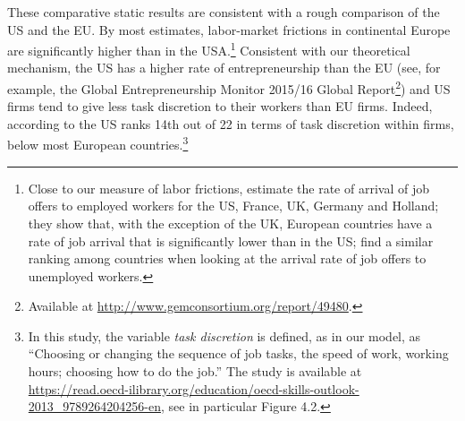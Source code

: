 \documentclass[12pt,american]{paper}
\theoremstyle{remark}
\begin{document}
These comparative static results are consistent with a rough comparison of the US and the EU.  By most estimates, labor-market frictions in continental Europe are significantly higher than in the USA.\footnote{%
Close to our measure of labor frictions, \citet{ridder2003measuring} estimate the rate of arrival of job offers to employed workers for the US, France, UK, Germany and Holland; they show that, with the exception of the UK, European countries have a rate of job arrival that is significantly lower than in the US; \citet*{layard2005unemployment} find a similar ranking among countries when looking at the arrival rate of job offers to unemployed workers.
 }  Consistent with our theoretical mechanism, the US has a higher rate of entrepreneurship than the EU (see, for example, the Global Entrepreneurship Monitor 2015/16 Global Report\footnote{%
  Available at \href{url}{http://www.gemconsortium.org/report/49480}.
 }) and US firms tend to give less task discretion to their workers than EU firms. Indeed, according to \cite{oecd2013} the US ranks 14th out of 22 in terms of task discretion within firms, below most European countries.\footnote{%
 In this study, the variable \textit{task discretion} is defined, as in our model, as ``Choosing or changing the sequence of job tasks, the speed of work, working hours; choosing how to do the job.'' The study is available at \url{https://read.oecd-ilibrary.org/education/oecd-skills-outlook-2013_9789264204256-en}, see in particular Figure 4.2.
 } 


\end{document}
